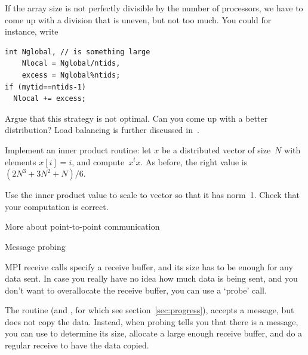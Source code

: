 If the array size is not perfectly divisible by the number of processors,
we have to come up with a division that is uneven, but not too much.
You could for instance, write

\lstset{style=reviewcode,language=C} %
\begin{lstlisting}
int Nglobal, // is something large
    Nlocal = Nglobal/ntids,
    excess = Nglobal%ntids;
if (mytid==ntids-1) 
  Nlocal += excess;
\end{lstlisting}

\begin{exercise}
  Argue that this strategy is not optimal. Can you come up with a
  better distribution?
  Load balancing is further discussed in~.
\end{exercise}

\begin{exercise}
  \label{ex:inproduct}
  Implement an inner product routine: let $x$ be a
  distributed vector of size~$N$ with elements $x[i]=i$,
  and compute~$x^tx$.
  As before, the right value is $(2N^3+3N^2+N)/6$.

  Use the inner product value to scale to vector so that it has
  norm~1.
  Check that your computation is correct.
\end{exercise}





 {More about point-to-point communication}

 {Message probing}

MPI receive calls specify a receive buffer, and its size has to be
enough for any data sent. In case you really have no idea how much data
is being sent, and you don't want to overallocate the receive buffer,
you can use a `probe' call.

The routine  (and ,
for which see section~\ref{sec:progress}), accepts a message,
but does not copy the data. Instead, when probing tells you that there is a
message, you can use  to determine its size,
allocate a large enough receive buffer, and do a regular receive to
have the data copied.




